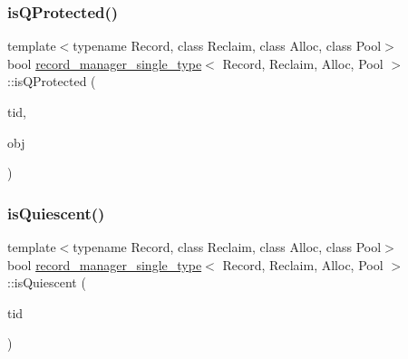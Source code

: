 \subsubsection{\texorpdfstring{is\+Q\+Protected()}{isQProtected()}}
{\footnotesize\ttfamily template$<$typename Record, class Reclaim, class Alloc, class Pool$>$ \\
bool \hyperlink{classrecord__manager__single__type}{record\+\_\+manager\+\_\+single\+\_\+type}$<$ Record, Reclaim, Alloc, Pool $>$\+::is\+Q\+Protected (\begin{DoxyParamCaption}\item[{const int}]{tid,  }\item[{\hyperlink{classrecord__manager__single__type_a065f05d1a84e619758122b3da04b1327}{record\+\_\+pointer}}]{obj }\end{DoxyParamCaption})\hspace{0.3cm}{\ttfamily [inline]}}

\mbox{\label{classrecord__manager__single__type_aa3096f0e5401e1454b94a4105cd8d728}} 
\subsubsection{\texorpdfstring{is\+Quiescent()}{isQuiescent()}}
{\footnotesize\ttfamily template$<$typename Record, class Reclaim, class Alloc, class Pool$>$ \\
bool \hyperlink{classrecord__manager__single__type}{record\+\_\+manager\+\_\+single\+\_\+type}$<$ Record, Reclaim, Alloc, Pool $>$\+::is\+Quiescent (\begin{DoxyParamCaption}\item[{const int}]{tid }\end{DoxyParamCaption})\hspace{0.3cm}{\ttfamily [inline]}}

\mbox{\label{classrecord__manager__single__type_a75dabb01db0fcc82a0c67fa06afdda62}} 
